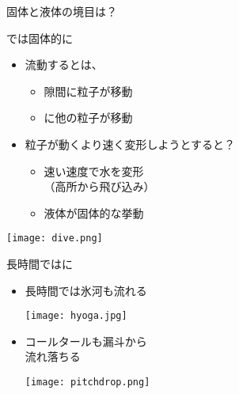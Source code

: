 \documentclass[uplatex,dvipdfmx,a4paper,11pt]{jsarticle}
\begin{document}
\begin{qlist}
\begin{qlist2}
			\qitem 固体と液体の境目は？
				\begin{center}
					\begin{minipage}{0.44\textwidth}
						\begin{center}
						\begin{itembox}[l]{\qbox{}では固体的に}
							\begin{itemize}
								\item 流動するとは、
								\begin{itemize}
									\item 隙間に粒子が移動
									\item \qbox{}に他の粒子が移動
								\end{itemize}
								\item 粒子が動くより速く変形しようとすると？
								\begin{itemize}
									\item 速い速度で水を変形\\（高所から飛び込み）
									\item 液体が固体的な挙動
								\end{itemize}
							\end{itemize}
						\end{itembox}
						\texttt{[image: dive.png]}
						\end{center}
					\end{minipage}
					\begin{minipage}{0.42\textwidth}
						\begin{center}
						\begin{itembox}[l]{長時間では\qbox{}に}
							\begin{itemize}
								\item 長時間では氷河も流れる
								
								\texttt{[image: hyoga.jpg]}
								\item コールタールも漏斗から\\流れ落ちる	
								
								\texttt{[image: pitchdrop.png]}
							\end{itemize}
						\end{itembox}
						\end{center}
					\end{minipage}
				\end{center}
				

\end{qlist2}
\end{qlist}
\end{document}
